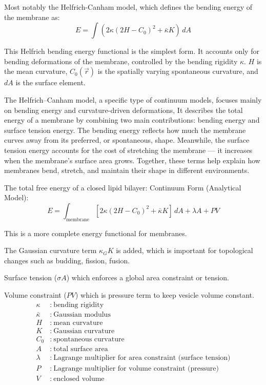 \documentclass[12pt]{article}
\begin{document}
\begin{flushleft}
Most notably the Helfrich-Canham model, which defines the bending energy of the membrane as:
\begin{equation}
E = \int \left( 2\kappa (2H - C_0)^2 + \bar{\kappa} K \right) \, dA
\end{equation}

This Helfrich bending energy functional is the simplest form. It accounts only for bending deformations of the membrane, controlled by the bending rigidity $\kappa$.
\( H \) is the mean curvature, \( C_0(\vec{r}) \) is the spatially varying spontaneous curvature, and \( dA \) is the surface element.



The Helfrich–Canham model, a specific type of continuum models, focuses mainly on bending energy and curvature-driven deformations, It describes the total energy of a membrane by combining two main contributions: bending energy and surface tension energy. The bending energy reflects how much the membrane curves away from its preferred, or spontaneous, shape. Meanwhile, the surface tension energy accounts for the cost of stretching the membrane — it increases when the membrane's surface area grows. Together, these terms help explain how membranes bend, stretch, and maintain their shape in different environments.


The total free energy of a closed lipid bilayer:
Continuum Form (Analytical Model):
\begin{equation}
E = \int_{\text{membrane}} \left[ 2\kappa (2H - C_0)^2 + \bar{\kappa} K \right] \, dA + \lambda A + PV
\end{equation}

\noindent This is a more complete energy functional for membranes.

The Gaussian curvature term \( \kappa_G K \) is added, which is important for topological changes such as budding, fission, fusion.

Surface tension (\( \sigma A \)) which enforces a global area constraint or tension.

Volume constraint (\( PV \)) which is pressure term to keep vesicle volume constant.
\begin{align*}
\kappa &:\ \text{bending rigidity} \\
\bar{\kappa} &:\ \text{Gaussian modulus} \\
H &:\ \text{mean curvature} \\
K &:\ \text{Gaussian curvature} \\
C_0 &:\ \text{spontaneous curvature} \\
A &:\ \text{total surface area} \\
\lambda &:\ \text{Lagrange multiplier for area constraint (surface tension)} \\
P &:\ \text{Lagrange multiplier for volume constraint (pressure)} \\
V &:\ \text{enclosed volume}
\end{align*}





\end{flushleft}
\end{document}
